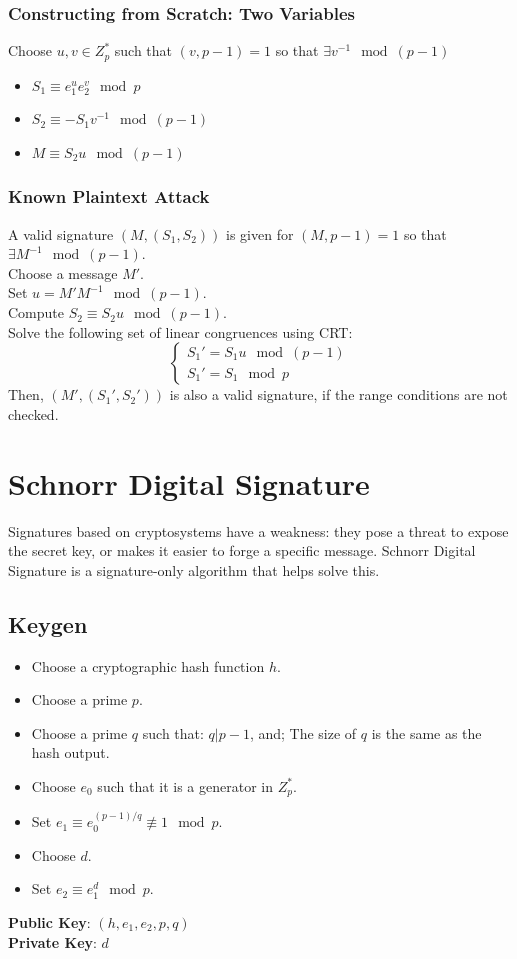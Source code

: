 \documentclass{report}
\begin{document}
			\subsubsection{Constructing from Scratch: Two Variables}
				Choose $u,v\in Z_p^*$ such that $(v,p-1)=1$ so that $\exists v^{-1} \mod(p-1)$
				\begin{itemize}
					\item $S_1 \equiv e_1^ue_2^v \mod p$
					\item $S_2 \equiv -S_1v^{-1} \mod (p-1)$
					\item $M \equiv S_2u \mod(p-1)$
				\end{itemize}
		
			\subsubsection{Known Plaintext Attack}
				A valid signature $(M,(S_1,S_2))$ is given for $(M,p-1)=1$ so that  $\exists M^{-1} \mod (p-1)$.\\
				Choose a message $M'$.\\
				Set $u=M'M^{-1} \mod (p-1)$.\\
				Compute $S_2 \equiv S_2u \mod (p-1)$.\\
				Solve the following set of linear congruences using CRT:
				\begin{displaymath}
				\begin{cases}
				S_1'=S_1u \mod(p-1)\\
				S_1'=S_1 \mod p
				\end{cases}
				\end{displaymath}
				Then, $(M',(S_1',S_2'))$ is also a valid signature, if the range conditions are not checked.
		
	\section{Schnorr Digital Signature}
		Signatures based on cryptosystems have a weakness: they pose a threat to expose the secret key, or makes it easier to forge a specific message. Schnorr Digital Signature is a signature-only algorithm that helps solve this.
		\subsection{Keygen}
			\begin{itemize}
				\item Choose a cryptographic hash function $h$.
				\item Choose a prime $p$.
				\item Choose a prime $q$ such that:
					\subitem $q|p-1$, and;
					\subitem The size of $q$ is the same as the hash output.
				\item Choose $e_0$ such that it is a generator in $Z_p^*$.
				\item Set $e_1 \equiv e_0^{(p-1)/q} \not\equiv 1 \mod p$.
				\item Choose $d$.
				\item Set $e_2 \equiv e_1^d \mod p$.
			\end{itemize}
			\textbf{Public Key}: $(h,e_1,e_2,p,q)$\\
			\textbf{Private Key}: $d$
\end{document}
